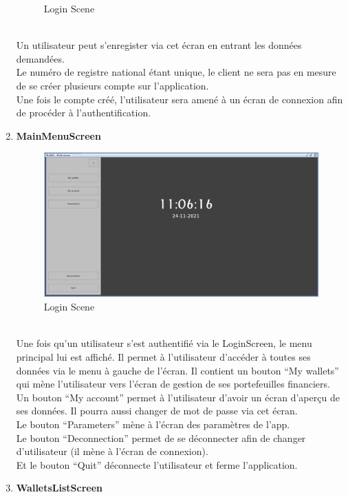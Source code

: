 \documentclass[../rapport.tex]{subfiles}
\begin{document}
\begin{enumerate}
\begin{figure}[h!]
				\caption{Login Scene}
		\end{figure}
		\\
Un utilisateur peut s'enregister via cet écran en entrant les données demandées.\\
Le numéro de registre national étant unique, le client ne sera pas en mesure de se créer plusieurs compte sur l'application.\\
Une fois le compte créé, l'utilisateur sera amené à un écran de connexion afin de procéder à l'authentification.
\newpage
\item \textbf{MainMenuScreen} \\
		\begin{figure}[h!]
				\centering \includegraphics[scale=0.2]{ressources/photos_diagrammes/app1/gui/mainMenu.jpg}
				\caption{Login Scene}
		\end{figure}
		\\
Une fois qu'un utilisateur s'est authentifié via le LoginScreen, le menu principal lui est affiché. Il permet à l'utilisateur d'accéder à toutes ses données via le menu à 
gauche de l'écran. Il contient un bouton ``My wallets'' qui mène l'utilisateur vers l'écran de gestion de ses portefeuilles financiers.\\
Un bouton ``My account'' permet à l'utilisateur d'avoir un écran d'aperçu de ses données. Il pourra aussi changer de mot de passe via cet écran.\\
Le bouton ``Parameters'' mène à l'écran des paramètres de l'app.\\
Le bouton ``Deconnection'' permet de se déconnecter afin de changer d'utilisateur (il mène à l'écran de connexion).\\
Et le bouton ``Quit'' déconnecte l'utilisateur et ferme l'application.
\newpage
\item \textbf{WalletsListScreen} \\

\end{enumerate}
\end{document}
